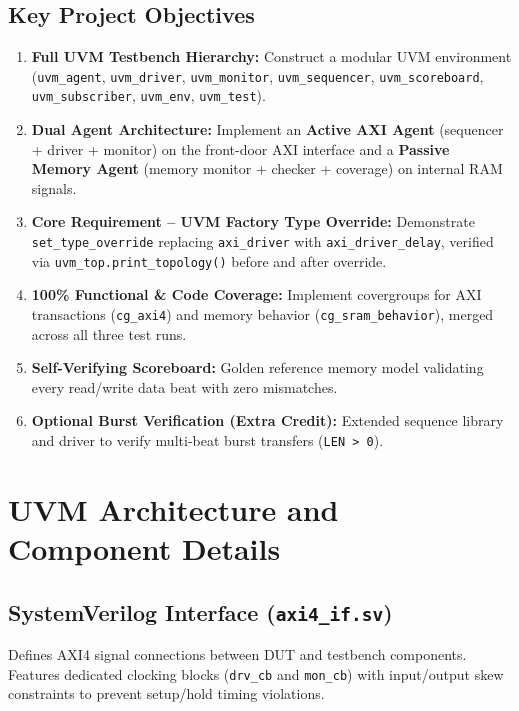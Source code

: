 \documentclass[10pt,a4paper]{article}
\begin{document}
\subsection{Key Project Objectives}
\begin{enumerate}
    \item \textbf{Full UVM Testbench Hierarchy:} Construct a modular UVM environment (\texttt{uvm\_agent}, \texttt{uvm\_driver}, \texttt{uvm\_monitor}, \texttt{uvm\_sequencer}, \texttt{uvm\_scoreboard}, \texttt{uvm\_subscriber}, \texttt{uvm\_env}, \texttt{uvm\_test}).
    \item \textbf{Dual Agent Architecture:} Implement an \textbf{Active AXI Agent} (sequencer + driver + monitor) on the front-door AXI interface and a \textbf{Passive Memory Agent} (memory monitor + checker + coverage) on internal RAM signals.
    \item \textbf{Core Requirement -- UVM Factory Type Override:} Demonstrate \texttt{set\_type\_override} replacing \texttt{axi\_driver} with \texttt{axi\_driver\_delay}, verified via \texttt{uvm\_top.print\_topology()} before and after override.
    \item \textbf{100\% Functional \& Code Coverage:} Implement covergroups for AXI transactions (\texttt{cg\_axi4}) and memory behavior (\texttt{cg\_sram\_behavior}), merged across all three test runs.
    \item \textbf{Self-Verifying Scoreboard:} Golden reference memory model validating every read/write data beat with zero mismatches.
    \item \textbf{Optional Burst Verification (Extra Credit):} Extended sequence library and driver to verify multi-beat burst transfers (\texttt{LEN > 0}).
\end{enumerate}

\section{UVM Architecture and Component Details}

\subsection{SystemVerilog Interface (\texttt{axi4\_if.sv})}
Defines AXI4 signal connections between DUT and testbench components. Features dedicated clocking blocks (\texttt{drv\_cb} and \texttt{mon\_cb}) with input/output skew constraints to prevent setup/hold timing violations.
\end{document}
